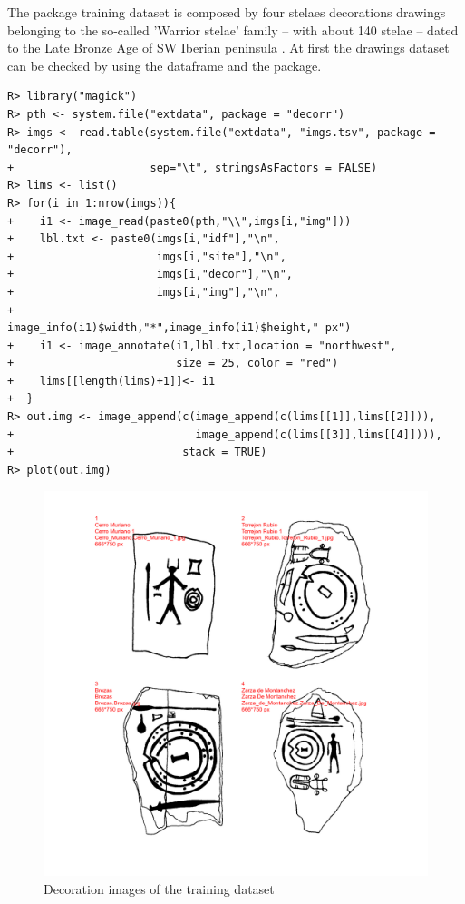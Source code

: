 \documentclass[article]{jss}\usepackage{knitr}
\begin{document}
%
The  package training dataset is composed by four stelaes decorations drawings \citep{DiazGuardamino10} belonging to the so-called 'Warrior stelae' family -- with about 140 stelae -- dated to the Late Bronze Age of SW Iberian peninsula \citep{Celestino01}. At first the drawings dataset can be checked by using the  dataframe and the  package.
%
\begin{kframe}
\begin{verbatim}
R> library("magick")
R> pth <- system.file("extdata", package = "decorr")
R> imgs <- read.table(system.file("extdata", "imgs.tsv", package = "decorr"),
+                     sep="\t", stringsAsFactors = FALSE)
R> lims <- list()
R> for(i in 1:nrow(imgs)){
+    i1 <- image_read(paste0(pth,"\\",imgs[i,"img"]))
+    lbl.txt <- paste0(imgs[i,"idf"],"\n",
+                      imgs[i,"site"],"\n",
+                      imgs[i,"decor"],"\n",
+                      imgs[i,"img"],"\n",
+                      image_info(i1)$width,"*",image_info(i1)$height," px")
+    i1 <- image_annotate(i1,lbl.txt,location = "northwest",
+                         size = 25, color = "red")
+    lims[[length(lims)+1]]<- i1
+  }
R> out.img <- image_append(c(image_append(c(lims[[1]],lims[[2]])),
+                            image_append(c(lims[[3]],lims[[4]]))),
+                          stack = TRUE)
R> plot(out.img)
\end{verbatim}
\end{kframe}\begin{figure}[H]

{\centering \includegraphics[width=\maxwidth]{figure/unnamed-chunk-4-1} 

}

\caption{\label{fig:figs}Decoration images of the training dataset}\label{fig:unnamed-chunk-4}
\end{figure}
\end{document}
